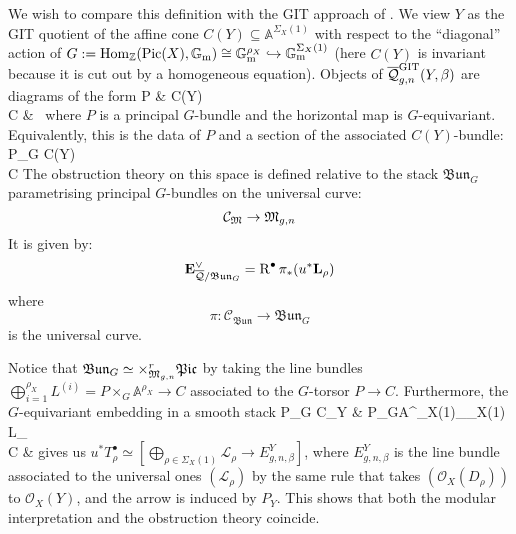 We wish to compare this definition with the GIT approach of \cite{CFKM}. We view $Y$ as the GIT quotient of the affine cone $C(Y)\subseteq \mathbb A^{\Sigma_X(1)}$ with respect to the ``diagonal'' action of $G:=\operatorname{Hom}_{\mathbb Z}(\operatorname{Pic}(X),\mathbb{G}_{\text{m}})\cong\mathbb{G}_{\text{m}}^{\rho_X}\hookrightarrow \mathbb{G}_{\text{m}}^{\Sigma_X(1)}$ (here $C(Y)$ is invariant because it is cut out by a homogeneous equation). Objects of $\overline{\mathcal{Q}}^{\operatorname{GIT}}_{g,n}(Y,\beta)$ are diagrams of the form
\bcd
P \ar[d] \ar[r] & C(Y) \\ 
C & \,
\ecd
where $P$ is a principal $G$-bundle and the horizontal map is $G$-equivariant. Equivalently, this is the data of $P$ and a section of the associated $C(Y)$-bundle:
\bcd
P\times_{G} C(Y)  \\
C 
\ecd
The obstruction theory on this space is defined relative to the stack $\mathfrak{Bun}_{G}$ parametrising principal $G$-bundles on the universal curve:
\begin{equation*} \mathcal{C}_{\mathfrak M} \rightarrow \mathfrak M_{g,n} \end{equation*}
It is given by:
\begin{equation*} \mathbf{E}_{\overline{\mathcal{Q}}/\mathfrak{Bun}_G}^\vee = \operatorname{R}^{\bullet} \pi_* (u^*\mathbf{L}_\rho) \end{equation*}
where
\begin{equation*} \pi \colon \mathcal C_{\mathfrak{Bun}}\to\mathfrak{Bun}_{G} \end{equation*}
is the universal curve.

Notice that $\mathfrak{Bun}_{G}\simeq\times^r_{\mathfrak M_{g,n}} \mathfrak{Pic}$ by taking the line bundles $\bigoplus_{i=1}^{\rho_X} L^{(i)}=P\times_{G}\mathbb A^{\rho_X}\to C$ associated to the $G$-torsor $P\to C$. Furthermore, the $G$-equivariant embedding in a smooth stack
\bcd
P\times_{G} C_Y \ar[r,hook] & P\times_{G}\mathbb A^{\lvert\Sigma_X(1)\rvert}\simeq \bigoplus_{\rho\in\Sigma_X(1)} L_{\rho}\ar[dl]\\
C  &
\ecd
gives us $u^*T^\bullet_\rho\simeq[\bigoplus_{\rho\in\Sigma_X(1)} \mathcal L_{\rho}\to E_{g,n,\beta}^Y]$, where $E_{g,n,\beta}^Y$ is the line bundle associated to the universal ones $(\mathcal L_\rho)$ by the same rule that takes $(\mathcal O_X(D_\rho))$ to $\mathcal O_X(Y)$, and the arrow is induced by $P_Y$. This shows that both the modular interpretation and the obstruction theory coincide.
